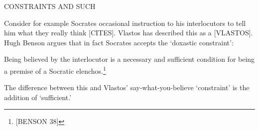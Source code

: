 \documentclass[11pt,letterpaper,oneside]{amsart} %
\begin{document}



CONSTRAINTS AND SUCH







Consider for example Socrates occasional instruction to his interlocutors to tell him what they really think [CITES]. Vlastos has described this as a [VLASTOS]. Hugh Benson argues that in fact Socrates accepts the `doxastic constraint':\begin{squote}[DC] Being believed by the interlocutor is a necessary and sufficient condition for being a premise of a Socratic elenchos.\footnote{[BENSON 38]}\end{squote} The difference between this and Vlastos' say-what-you-believe `constraint' is the addition of `sufficient.'
\end{document}
